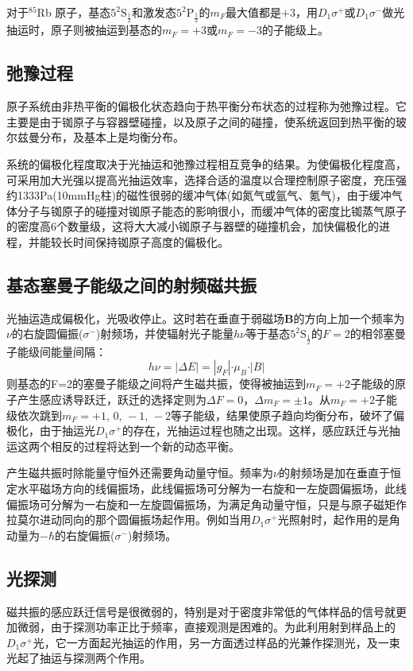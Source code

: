 \documentclass[a4paper]{article}
\begin{document}
对于$^{85}$Rb 原子，基态$5^2\text{S}_{\frac{1}{2}}$和激发态$5^2\text{P}_{\frac{1}{2}}$的$m_F$最大值都是$+3$，用$D_1\sigma^{+}$或$D_1\sigma^{-}$做光抽运时，原子则被抽运到基态的$m_F = +3$或$m_F = -3$的子能级上。
\subsection{弛豫过程}
原子系统由非热平衡的偏极化状态趋向于热平衡分布状态的过程称为弛豫过程。它主要是由于铷原子与容器壁碰撞，以及原子之间的碰撞，使系统返回到热平衡的玻尔兹曼分布，及基本上是均衡分布。

系统的偏极化程度取决于光抽运和弛豫过程相互竞争的结果。为使偏极化程度高，可采用加大光强以提高光抽运效率，选择合适的温度以合理控制原子密度，充压强约1333Pa(10mmHg柱)的磁性很弱的缓冲气体(如氮气或氩气、氪气)，由于缓冲气体分子与铷原子的碰撞对铷原子能态的影响很小，而缓冲气体的密度比铷蒸气原子的密度高6个数量级，这将大大减小铷原子与器壁的碰撞机会，加快偏极化的进程，并能较长时间保持铷原子高度的偏极化。
\subsection{基态塞曼子能级之间的射频磁共振}
光抽运造成偏极化，光吸收停止。这时若在垂直于弱磁场$\bm{B}$的方向上加一个频率为$\nu$的右旋圆偏振($\sigma^{-}$)射频场，并使辐射光子能量$h\nu$等于基态$5^2\text{S}_{\frac{1}{2}}$的$F=2$的相邻塞曼子能级间能量间隔：
\begin{equation}
h\nu = |\Delta E| = |g_F|\bm{\cdot}\mu_B\bm{\cdot}|B|\label{eq4}
\end{equation}
则基态的F=2的塞曼子能级之间将产生磁共振，使得被抽运到$m_F = +2$子能级的原子产生感应诱导跃迁，跃迁的选择定则为$\Delta F = 0$，$\Delta m_F = \pm 1$。从$m_F = +2$子能级依次跳到$m_F = +1\text{, }0\text{, }-1\text{, }-2$等子能级，结果使原子趋向均衡分布，破坏了偏极化，由于抽运光$D_1\sigma^{+}$的存在，光抽运过程也随之出现。这样，感应跃迁与光抽运这两个相反的过程将达到一个新的动态平衡。

产生磁共振时除能量守恒外还需要角动量守恒。频率为$\nu$的射频场是加在垂直于恒定水平磁场方向的线偏振场，此线偏振场可分解为一右旋和一左旋圆偏振场，此线偏振场可分解为一右旋和一左旋圆偏振场，为满足角动量守恒，只是与原子磁矩作拉莫尔进动同向的那个圆偏振场起作用。例如当用$D_1\sigma^{+}$光照射时，起作用的是角动量为$-\hbar$的右旋偏振($\sigma^{-}$)射频场。
\subsection{光探测}
磁共振的感应跃迁信号是很微弱的，特别是对于密度非常低的气体样品的信号就更加微弱，由于探测功率正比于频率，直接观测是困难的。为此利用射到样品上的$D_1\sigma^{+}$光，它一方面起光抽运的作用，另一方面透过样品的光兼作探测光，及一束光起了抽运与探测两个作用。
\end{document}
